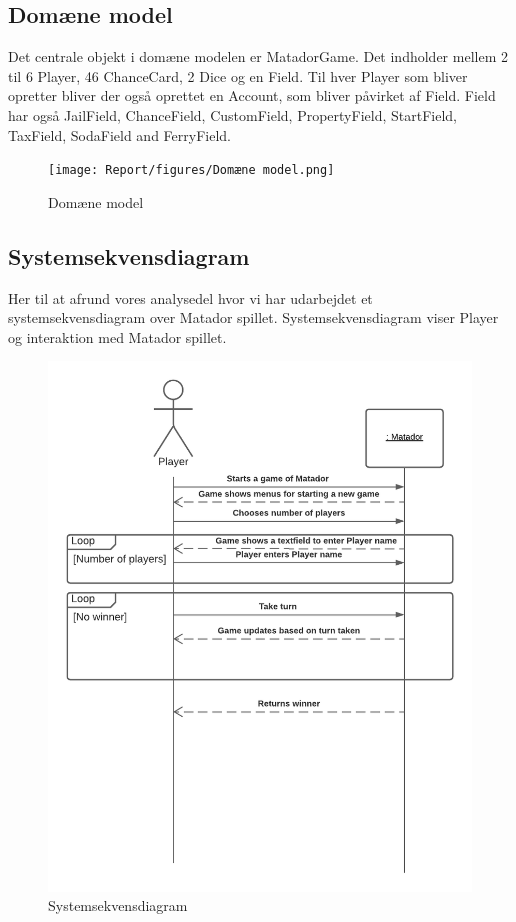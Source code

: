 \begin{flushleft}
\subsection{Domæne model}
Det centrale objekt i domæne modelen er MatadorGame. Det indholder mellem 2 til 6 Player, 46 ChanceCard, 2 Dice og en Field. Til hver Player som bliver opretter bliver der også oprettet en Account, som bliver påvirket af Field. Field har også JailField, ChanceField, CustomField, PropertyField, StartField, TaxField, SodaField and FerryField.
\begin{figure}[htp]
    \centering
    \texttt{[image: Report/figures/Domæne model.png]}
    \caption{Domæne model}
\end{figure}

\subsection{Systemsekvensdiagram}
Her til at afrund vores analysedel hvor vi har udarbejdet et systemsekvensdiagram over Matador spillet. Systemsekvensdiagram viser Player og interaktion med Matador spillet. 
\begin{figure}[htp]
    \centering
    \includegraphics[width=13cm]{Report/figures/System Sekvens Diagram.png}
    \caption{Systemsekvensdiagram}
\end{figure}

\end{flushleft}